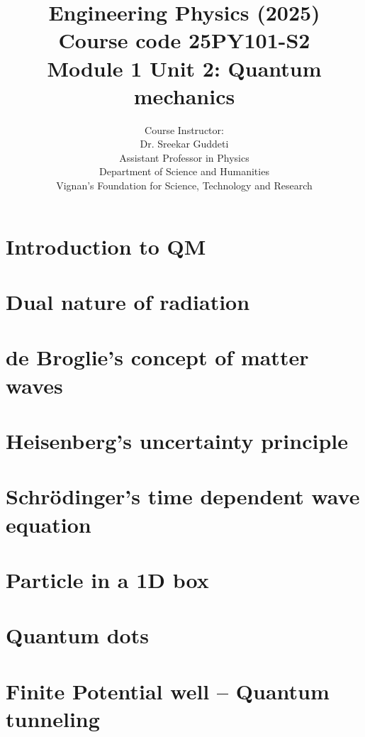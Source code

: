 \documentclass[aspectratio=169]{beamer}
\title[Engineering Physics]{Engineering Physics (2025) \\ Course code
	25PY101-S2 \\ Module 1 Unit 2: Quantum mechanics}
\author{Course Instructor:\\ 
	{\color{VignanBlue} Dr. Sreekar Guddeti}\\
	Assistant Professor in Physics\\
	Department of Science and Humanities \\
	{\color{VignanRed}Vignan's Foundation for Science, Technology and Research}
}
\newif\ifshowhidden
\begin{document}
	\frame{\titlepage}
	
	\section{Introduction to QM}
	
	\section{Dual nature of radiation}
	
	\section{de Broglie's concept of matter waves}
	
	\section{Heisenberg's uncertainty principle}
	
	\section{Schr\"odinger's time dependent wave equation}
	
	\section{Particle in a 1D box}
	
	\section{Quantum dots}
	\ifshowhidden
	
	\fi
	\section{Finite Potential well -- Quantum tunneling}
	\ifshowhidden
	
	\fi
\end{document}
